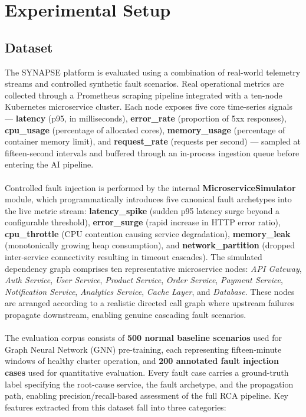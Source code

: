 
\section{Experimental Setup}

\subsection{Dataset}

\hspace*{0.3in} The SYNAPSE platform is evaluated using a combination of real-world telemetry streams and controlled synthetic fault scenarios. Real operational metrics are collected through a Prometheus scraping pipeline integrated with a ten-node Kubernetes microservice cluster. Each node exposes five core time-series signals — \textbf{latency} (p95, in milliseconds), \textbf{error\_rate} (proportion of 5xx responses), \textbf{cpu\_usage} (percentage of allocated cores), \textbf{memory\_usage} (percentage of container memory limit), and \textbf{request\_rate} (requests per second) — sampled at fifteen-second intervals and buffered through an in-process ingestion queue before entering the AI pipeline.\\\\

\hspace*{0.3in} Controlled fault injection is performed by the internal \textbf{MicroserviceSimulator} module, which programmatically introduces five canonical fault archetypes into the live metric stream: \textbf{latency\_spike} (sudden p95 latency surge beyond a configurable threshold), \textbf{error\_surge} (rapid increase in HTTP error ratio), \textbf{cpu\_throttle} (CPU contention causing service degradation), \textbf{memory\_leak} (monotonically growing heap consumption), and \textbf{network\_partition} (dropped inter-service connectivity resulting in timeout cascades). The simulated dependency graph comprises ten representative microservice nodes: \textit{API Gateway}, \textit{Auth Service}, \textit{User Service}, \textit{Product Service}, \textit{Order Service}, \textit{Payment Service}, \textit{Notification Service}, \textit{Analytics Service}, \textit{Cache Layer}, and \textit{Database}. These nodes are arranged according to a realistic directed call graph where upstream failures propagate downstream, enabling genuine cascading fault scenarios.\\\\

\hspace*{0.3in} The evaluation corpus consists of \textbf{500 normal baseline scenarios} used for Graph Neural Network (GNN) pre-training, each representing fifteen-minute windows of healthy cluster operation, and \textbf{200 annotated fault injection cases} used for quantitative evaluation. Every fault case carries a ground-truth label specifying the root-cause service, the fault archetype, and the propagation path, enabling precision/recall-based assessment of the full RCA pipeline. Key features extracted from this dataset fall into three categories:

